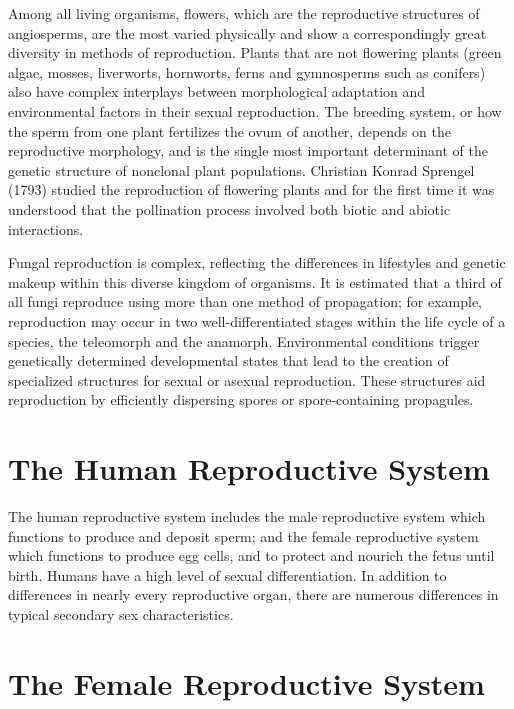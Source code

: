 Among all living organisms, flowers, which are the reproductive structures of angiosperms, are the most varied physically and show a correspondingly great diversity in methods of reproduction. Plants that are not flowering plants (green algae, mosses, liverworts, hornworts, ferns and gymnosperms such as conifers) also have complex interplays between morphological adaptation and environmental factors in their sexual reproduction. The breeding system, or how the sperm from one plant fertilizes the ovum of another, depends on the reproductive morphology, and is the single most important determinant of the genetic structure of nonclonal plant populations. Christian Konrad Sprengel (1793) studied the reproduction of flowering plants and for the first time it was understood that the pollination process involved both biotic and abiotic interactions.

Fungal reproduction is complex, reflecting the differences in lifestyles and genetic makeup within this diverse kingdom of organisms. It is estimated that a third of all fungi reproduce using more than one method of propagation; for example, reproduction may occur in two well-differentiated stages within the life cycle of a species, the teleomorph and the anamorph. Environmental conditions trigger genetically determined developmental states that lead to the creation of specialized structures for sexual or asexual reproduction. These structures aid reproduction by efficiently dispersing spores or spore-containing propagules.

\hypertarget{the-human-reproductive-system}{%
\section{The Human Reproductive System}\label{the-human-reproductive-system}}

The human reproductive system includes the male reproductive system which functions to produce and deposit sperm; and the female reproductive system which functions to produce egg cells, and to protect and nourich the fetus until birth. Humans have a high level of sexual differentiation. In addition to differences in nearly every reproductive organ, there are numerous differences in typical secondary sex characteristics.

\hypertarget{the-female-reproductive-system}{%
\section{The Female Reproductive System}\label{the-female-reproductive-system}}

